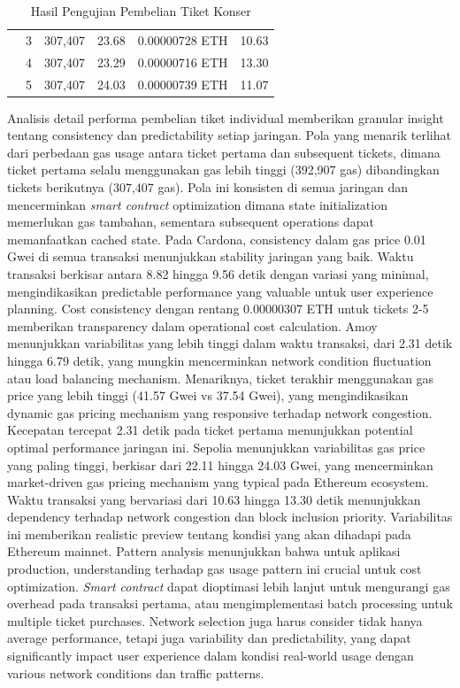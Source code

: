 \begin{table}[h]
\begin{tabular}{|c|c|c|c|c|c|}
                     & 3                  & 307,407           & 23.68                     & 0.00000728 ETH & 10.63             \\
                     & 4                  & 307,407           & 23.29                     & 0.00000716 ETH & 13.30             \\
                     & 5                  & 307,407           & 24.03                     & 0.00000739 ETH & 11.07             \\
    \hline
  \end{tabular}
  \caption{Hasil Pengujian Pembelian Tiket Konser}
\end{table}

Analisis detail performa pembelian tiket individual memberikan granular insight
tentang consistency dan predictability setiap jaringan. Pola yang menarik
terlihat dari perbedaan gas usage antara ticket pertama dan subsequent tickets,
dimana ticket pertama selalu menggunakan gas lebih tinggi (392,907 gas)
dibandingkan tickets berikutnya (307,407 gas). Pola ini konsisten di semua
jaringan dan mencerminkan \emph{smart contract} optimization dimana state
initialization memerlukan gas tambahan, sementara subsequent operations dapat
memanfaatkan cached state. Pada Cardona, consistency dalam gas price 0.01 Gwei
di semua transaksi menunjukkan stability jaringan yang baik. Waktu transaksi
berkisar antara 8.82 hingga 9.56 detik dengan variasi yang minimal,
mengindikasikan predictable performance yang valuable untuk user experience
planning. Cost consistency dengan rentang 0.00000307 ETH untuk tickets 2-5
memberikan transparency dalam operational cost calculation. Amoy menunjukkan
variabilitas yang lebih tinggi dalam waktu transaksi, dari 2.31 detik hingga
6.79 detik, yang mungkin mencerminkan network condition fluctuation atau load
balancing mechanism. Menariknya, ticket terakhir menggunakan gas price yang
lebih tinggi (41.57 Gwei vs 37.54 Gwei), yang mengindikasikan dynamic gas
pricing mechanism yang responsive terhadap network congestion. Kecepatan
tercepat 2.31 detik pada ticket pertama menunjukkan potential optimal
performance jaringan ini. Sepolia menunjukkan variabilitas gas price yang
paling tinggi, berkisar dari 22.11 hingga 24.03 Gwei, yang mencerminkan
market-driven gas pricing mechanism yang typical pada Ethereum ecosystem. Waktu
transaksi yang bervariasi dari 10.63 hingga 13.30 detik menunjukkan dependency
terhadap network congestion dan block inclusion priority. Variabilitas ini
memberikan realistic preview tentang kondisi yang akan dihadapi pada Ethereum
mainnet. Pattern analysis menunjukkan bahwa untuk aplikasi production,
understanding terhadap gas usage pattern ini crucial untuk cost optimization.
\emph{Smart contract} dapat dioptimasi lebih lanjut untuk mengurangi gas
overhead pada transaksi pertama, atau mengimplementasi batch processing untuk
multiple ticket purchases. Network selection juga harus consider tidak hanya
average performance, tetapi juga variability dan predictability, yang dapat
significantly impact user experience dalam kondisi real-world usage dengan
various network conditions dan traffic patterns.

